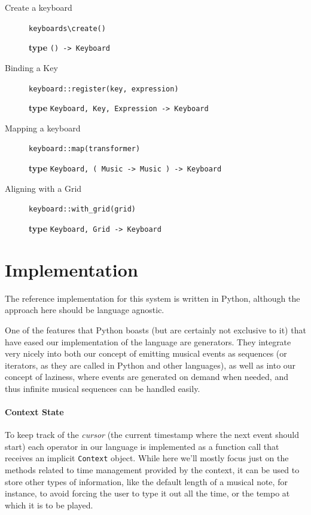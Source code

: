 \documentclass[a4paper,UKenglish,cleveref, autoref]{oasics-v2019}
\begin{document}
\begin{description}
    \item[Create a keyboard] \verb|keyboards\create()|
    
        \textbf{type} \verb|() -> Keyboard|
    \item[Binding a Key] \verb'keyboard::register(key, expression)'
        
        \textbf{type} \verb|Keyboard, Key, Expression -> Keyboard|
    \item[Mapping a keyboard] \verb'keyboard::map(transformer)'
        
        \textbf{type} \verb|Keyboard, ( Music -> Music ) -> Keyboard|
    \item[Aligning with a Grid] \verb'keyboard::with_grid(grid)'
        
        \textbf{type} \verb|Keyboard, Grid -> Keyboard|    
\end{description}


\section{Implementation}
The reference implementation for this system is written in Python, although the approach here should be language agnostic.

One of the features that Python boasts (but are certainly not exclusive to it) that have eased our implementation of the language are generators\cite{PEP255}. They integrate very nicely into both our concept of emitting musical events as sequences (or iterators, as they are called in Python and other languages), as well as into our concept of laziness, where events are generated on demand when needed, and thus infinite musical sequences can be handled easily.

\paragraph*{Context State}
To keep track of the \textit{cursor} (the current timestamp where the next event should start) each operator in our language is implemented as a function call that receives an implicit \texttt{Context} object. While here we'll mostly focus just on the methods related to time management provided by the context, it can be used to store other types of information, like the default length of a musical note, for instance, to avoid forcing the user to type it out all the time, or the tempo at which it is to be played.
\end{document}
